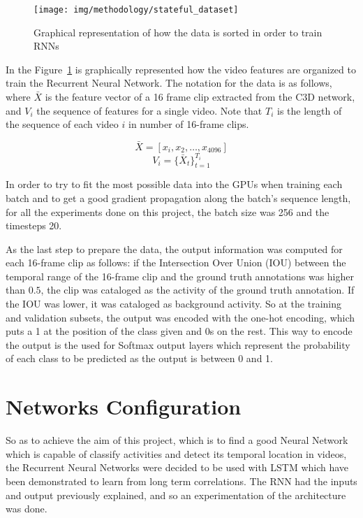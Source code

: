 \begin{figure}[H]
\begin{center}
\texttt{[image: img/methodology/stateful\_dataset]}
\end{center}
\caption{Graphical representation of how the data is sorted in order to train RNNs}
\label{fig:stateful_dataset}
\end{figure}

In the Figure~\ref{fig:stateful_dataset} is graphically represented how the video features are organized to train the Recurrent Neural Network. The notation for the data is as follows, where $\bar{X}$ is the feature vector of a 16 frame clip extracted from the C3D network, and $V_i$ the sequence of features for a single video. Note that $T_i$ is the length of the sequence of each video $i$ in number of 16-frame clips.

\begin{equation}
	\bar{X} = [x_i, x_2, \ldots, x_{4096}]
\end{equation}
\begin{equation}
	V_i = \{ \bar{X}_t \}_{t=1}^{T_i}
\end{equation}

In order to try to fit the most possible data into the GPUs when training each batch and to get a good gradient propagation along the batch's sequence length, for all the experiments done on this project, the batch size was 256 and the timesteps 20.

As the last step to prepare the data, the output information was computed for each 16-frame clip as follows: if the Intersection Over Union (IOU) between the temporal range of the 16-frame clip and the ground truth annotations was higher than $0.5$, the clip was cataloged as the activity of the ground truth annotation. If the IOU was lower, it was cataloged as background activity. So at the training and validation subsets, the output was encoded with the one-hot encoding, which puts a 1 at the position of the class given and 0s on the rest. This way to encode the output is the used for Softmax output layers which represent the probability of each class to be predicted as the output is between 0 and 1.

\section{Networks Configuration}

So as to achieve the aim of this project, which is to find a good Neural Network which is capable of classify activities and detect its temporal location in videos, the Recurrent Neural Networks were decided to be used with LSTM which have been demonstrated to learn from long term correlations. The RNN had the inputs and output previously explained, and so an experimentation of the architecture was done. 

